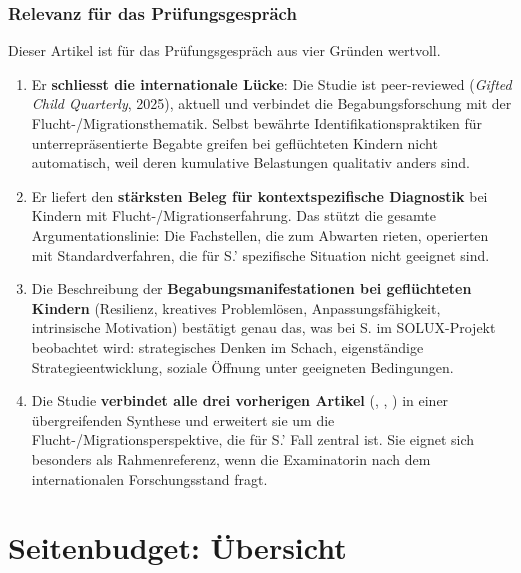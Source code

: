 \documentclass[ngerman, a4paper]{article}
\begin{document}
\subsubsection*{Relevanz für das Prüfungsgespräch}

Dieser Artikel ist für das Prüfungsgespräch aus vier Gründen wertvoll.

\begin{enumerate}
  \item Er \textbf{schliesst die internationale Lücke}: Die Studie ist
    peer-reviewed (\textit{Gifted Child Quarterly}, 2025), aktuell und
    verbindet die Begabungsforschung mit der Flucht-/Migrationsthematik.
    Selbst bewährte Identifikationspraktiken für unterrepräsentierte
    Begabte greifen bei geflüchteten Kindern nicht automatisch, weil
    deren kumulative Belastungen qualitativ anders sind.
  \item Er liefert den \textbf{stärksten Beleg für kontextspezifische
    Diagnostik} bei Kindern mit Flucht-/Migrationserfahrung. Das stützt
    die gesamte Argumentationslinie: Die Fachstellen, die zum Abwarten
    rieten, operierten mit Standardverfahren, die für S.' spezifische
    Situation nicht geeignet sind.
  \item Die Beschreibung der \textbf{Begabungsmanifestationen bei
    geflüchteten Kindern} (Resilienz, kreatives Problemlösen,
    Anpassungsfähigkeit, intrinsische Motivation) bestätigt genau das,
    was bei S. im SOLUX-Projekt beobachtet wird: strategisches Denken im
    Schach, eigenständige Strategieentwicklung, soziale Öffnung unter
    geeigneten Bedingungen.
  \item Die Studie \textbf{verbindet alle drei vorherigen Artikel}
    (\textcite{mun2020identifying}, \textcite{gubbins2020promising},
    \textcite{alhroub2021utility}) in einer übergreifenden Synthese und
    erweitert sie um die Flucht-/Migrationsperspektive, die für S.' Fall
    zentral ist. Sie eignet sich besonders als Rahmenreferenz, wenn die
    Examinatorin nach dem internationalen Forschungsstand fragt.
\end{enumerate}


\section*{Seitenbudget: Übersicht}
 
\end{document}
